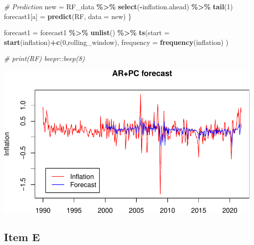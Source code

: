 \documentclass[
]{article}
\newenvironment{Shaded}{\begin{snugshade}}{\end{snugshade}}
\newcommand{\AttributeTok}[1]{\textcolor[rgb]{0.13,0.29,0.53}{#1}}
\newcommand{\CommentTok}[1]{\textcolor[rgb]{0.56,0.35,0.01}{\textit{#1}}}
\newcommand{\DecValTok}[1]{\textcolor[rgb]{0.00,0.00,0.81}{#1}}
\newcommand{\FunctionTok}[1]{\textcolor[rgb]{0.13,0.29,0.53}{\textbf{#1}}}
\newcommand{\NormalTok}[1]{#1}
\newcommand{\OtherTok}[1]{\textcolor[rgb]{0.56,0.35,0.01}{#1}}
\newcommand{\SpecialCharTok}[1]{\textcolor[rgb]{0.81,0.36,0.00}{\textbf{#1}}}
\begin{document}
\begin{Shaded}
\begin{Highlighting}[]
  \CommentTok{\# Prediction}
\NormalTok{  new }\OtherTok{=}\NormalTok{ RF\_data }\SpecialCharTok{\%\textgreater{}\%} \FunctionTok{select}\NormalTok{(}\SpecialCharTok{{-}}\NormalTok{inflation.ahead) }\SpecialCharTok{\%\textgreater{}\%} \FunctionTok{tail}\NormalTok{(}\DecValTok{1}\NormalTok{)}
\NormalTok{  forecast1[a] }\OtherTok{=} \FunctionTok{predict}\NormalTok{(RF, }\AttributeTok{data =}\NormalTok{ new)}
\NormalTok{\}}

\NormalTok{forecast1 }\OtherTok{=}\NormalTok{ forecast1 }\SpecialCharTok{\%\textgreater{}\%} \FunctionTok{unlist}\NormalTok{() }\SpecialCharTok{\%\textgreater{}\%} 
  \FunctionTok{ts}\NormalTok{(}\AttributeTok{start =} \FunctionTok{start}\NormalTok{(inflation)}\SpecialCharTok{+}\FunctionTok{c}\NormalTok{(}\DecValTok{0}\NormalTok{,rolling\_window), }\AttributeTok{frequency =}  \FunctionTok{frequency}\NormalTok{(inflation) )}
\end{Highlighting}
\end{Shaded}

\begin{Shaded}
\begin{Highlighting}[]
\CommentTok{\# print(RF) beepr::beep(8)}
\end{Highlighting}
\end{Shaded}

\includegraphics{Trabalho_Econo4_Q3_files/figure-latex/unnamed-chunk-5-1.pdf}

\hypertarget{item-e}{%
\subsection{Item E}\label{item-e}}
\end{document}
